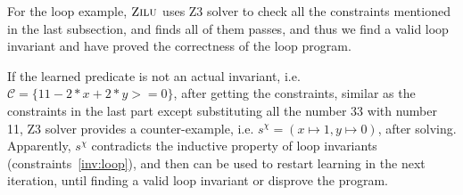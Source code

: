 For the loop example, $\textsc{Zilu}$ uses Z3 solver to check all the constraints mentioned in the last subsection,
and finds all of them passes, and thus we find a valid loop invariant and have proved the correctness of the loop program.

If the learned predicate is not an actual invariant, i.e. $\mathcal{C} = \{11-2*x+2*y>=0\}$,
after getting the constraints, similar as the constraints in the last part except substituting all the number 33 with number 11, 
Z3 solver provides a counter-example, i.e. $s^{\chi} = (x \mapsto 1, y \mapsto 0)$, after solving.
Apparently, $s^{\chi}$ contradicts the inductive property of loop invariants (constraints~\ref{inv:loop}), 
and then can be used to restart learning in the next iteration, until finding a valid loop invariant or disprove the program.






